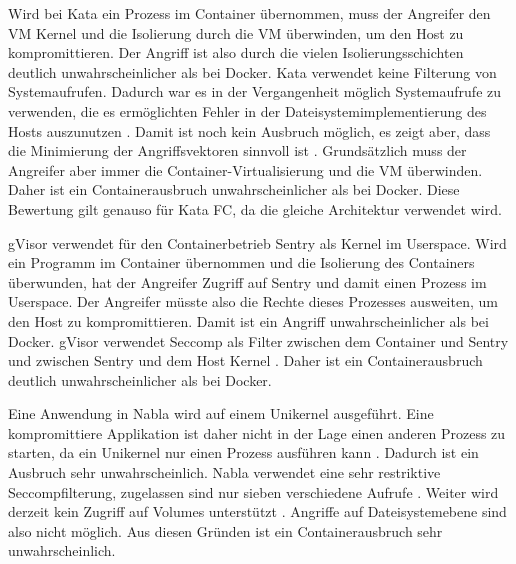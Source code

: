 Wird bei Kata ein Prozess im Container übernommen, muss der Angreifer den \ac{VM} Kernel und die Isolierung durch die \ac{VM} überwinden, um den Host zu kompromittieren. Der Angriff ist also durch die vielen Isolierungsschichten deutlich unwahrscheinlicher als bei Docker. Kata verwendet keine Filterung von Systemaufrufen. Dadurch war es in der Vergangenheit möglich Systemaufrufe zu verwenden, die es ermöglichten Fehler in der Dateisystemimplementierung des Hosts auszunutzen \cite[vgl.][]{TheMITRECorporation.2018}. Damit ist noch kein Ausbruch möglich, es zeigt aber, dass die Minimierung der Angriffsvektoren sinnvoll ist \cite[vgl.][]{Nablacontainers.20190515}. Grundsätzlich muss der Angreifer aber immer die Container-Virtualisierung und die \ac{VM} überwinden. Daher ist ein Containerausbruch unwahrscheinlicher als bei Docker. Diese Bewertung gilt genauso  für Kata FC, da die gleiche Architektur verwendet wird.

gVisor verwendet für den Containerbetrieb Sentry als Kernel im Userspace. Wird ein Programm im Container übernommen und die Isolierung des Containers überwunden, hat der Angreifer Zugriff auf Sentry und damit einen Prozess im Userspace. Der Angreifer müsste also die Rechte dieses Prozesses ausweiten, um den Host zu kompromittieren. Damit ist ein Angriff unwahrscheinlicher als bei Docker. gVisor verwendet Seccomp als Filter zwischen dem Container und Sentry und zwischen Sentry und dem Host Kernel \cite[vgl.][2]{EthanG.Young.2019}. Daher ist ein Containerausbruch deutlich unwahrscheinlicher als bei Docker.

Eine Anwendung in Nabla wird auf einem Unikernel ausgeführt. Eine kompromittiere Applikation ist daher nicht in der Lage einen anderen Prozess zu starten, da ein Unikernel nur einen Prozess ausführen kann \cite[vgl.][S. 109 f.]{UdoSeidel.2018}. Dadurch ist ein Ausbruch sehr unwahrscheinlich. Nabla verwendet eine sehr restriktive Seccompfilterung, zugelassen sind nur sieben verschiedene Aufrufe   \cite[vgl.][109]{UdoSeidel.2018}. Weiter wird derzeit kein Zugriff auf Volumes unterstützt \cite[vgl.][]{Nablacontainers.20190501}. Angriffe auf Dateisystemebene sind also nicht möglich. Aus diesen Gründen ist ein Containerausbruch sehr unwahrscheinlich.


